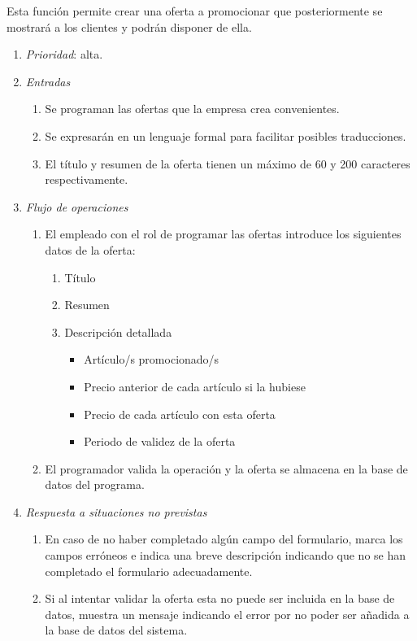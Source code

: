 

 \label{fun:programaroferta}
	Esta función permite crear una oferta a promocionar que posteriormente se mostrará a los clientes y podrán disponer de ella.
	
\begin{enumerate}
	\item \textit{Prioridad}: alta.
	\item \textit{Entradas}
	\begin{enumerate}
		\item Se programan las ofertas que la empresa crea convenientes.
		\item Se expresarán en un lenguaje formal para facilitar posibles traducciones.
		\item El título y resumen de la oferta tienen un máximo de 60 y 200 caracteres respectivamente.
	\end{enumerate}
	\item \textit{Flujo de operaciones}
	\begin{enumerate}
		\item El empleado con el rol de programar las ofertas introduce los siguientes datos de la oferta:
		
			\begin{enumerate}
				\item Título
				\item Resumen
				\item Descripción detallada
				
					\begin{itemize}
						\item Artículo/s promocionado/s
						\item Precio anterior de cada artículo si la hubiese
						\item Precio de cada artículo con esta oferta
						\item Periodo de validez de la oferta
					\end{itemize}
				
			\end{enumerate}
		\item El programador valida la operación y la oferta se almacena en la base de datos del programa.
	\end{enumerate}
	\item \textit{Respuesta a situaciones no previstas}
	\begin{enumerate}
		\item En caso de no haber completado algún campo del formulario, marca los campos erróneos e indica una breve descripción indicando que no se han completado el formulario adecuadamente.
		\item Si al intentar validar la oferta esta no puede ser incluida en la base de datos, muestra un mensaje indicando el error por no poder ser añadida a la base de datos del sistema.
	\end{enumerate}
\end{enumerate}
